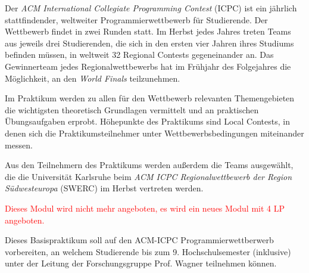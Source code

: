 \begin{module}
\begin{content}
Der \emph{ACM International Collegiate Programming Contest} (ICPC) ist ein jährlich stattfindender, weltweiter Programmierwettbewerb für Studierende. Der Wettbewerb findet in zwei Runden statt. Im Herbst jedes Jahres treten Teams aus jeweils drei Studierenden, die sich in den ersten vier Jahren ihres Studiums befinden müssen, in weltweit 32 Regional Contests gegeneinander an. Das Gewinnerteam jedes Regionalwettbewerbs hat im Frühjahr des Folgejahres die Möglichkeit, an den \emph{World Finals} teilzunehmen.

 

Im Praktikum werden zu allen für den Wettbewerb relevanten Themengebieten die wichtigsten theoretisch Grundlagen vermittelt und an praktischen Übungsaufgaben erprobt. Höhepunkte des Praktikums sind Local Contests, in denen sich die Praktikumsteilnehmer unter Wettbewerbsbedingungen miteinander messen.

 

Aus den Teilnehmern des Praktikums werden außerdem die Teams ausgewählt, die die Universität Karlsruhe beim \emph{ACM ICPC Regionalwettbewerb der Region Südwesteuropa} (SWERC) im Herbst vertreten werden.


\end{content}

\begin{remarks}\textcolor{red}{Dieses Modul wird nicht mehr angeboten, es wird ein neues Modul mit 4 LP angeboten.}

 

Dieses Basispraktikum soll auf den ACM-ICPC Programmierwettberwerb vorbereiten, an welchem Studierende bis zum 9. Hochschulsemester (inklusive) unter der Leitung der Forschungsgruppe Prof. Wagner teilnehmen können.

\end{remarks}

\end{module}

